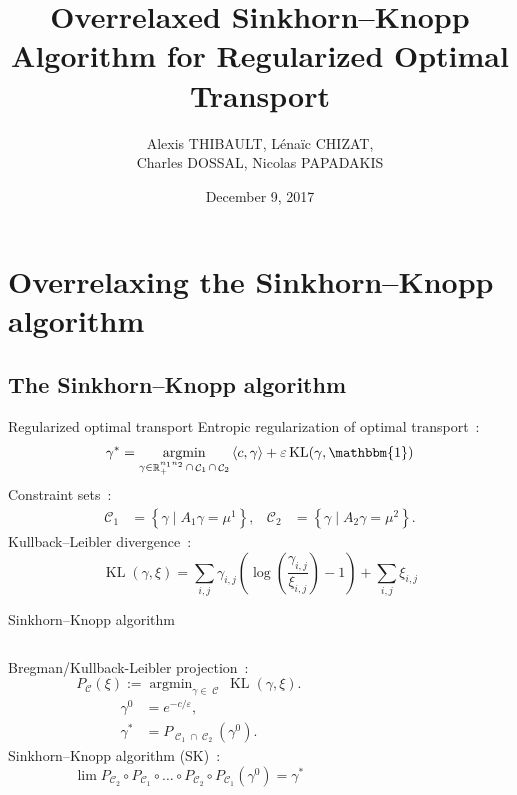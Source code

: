 \documentclass[compress]{beamer}
\title[Overrelaxed Sinkhorn--Knopp]{Overrelaxed Sinkhorn--Knopp Algorithm for Regularized Optimal Transport}
\author[A. THIBAULT]{
	Alexis THIBAULT, 
	L\'ena\"ic CHIZAT,\\
	Charles DOSSAL,
	Nicolas PAPADAKIS
}
\institute[OTML'17]{Optimal Transport and Machine Learning workshop \\ NIPS 2017}
\date{December 9, 2017}
\newcommand{\scal}[2]{\left\langle #1 , #2 \right\rangle}
\DeclareMathOperator{\IR}{\mathbb{R}}
\DeclareMathOperator*{\argmin}{argmin}
\DeclareMathOperator{\One}{\mathbbm{1}}
\DeclareMathOperator{\Ccal}{\mathcal{C}}
\DeclareMathOperator{\KL}{KL}
\renewcommand{\epsilon}{\varepsilon}
\begin{document}
\titlepage

\begin{frame}
\tableofcontents
\end{frame}

\section[Overrelaxing SK]{Overrelaxing the Sinkhorn--Knopp algorithm}

\subsection[SK algorithm]{The Sinkhorn--Knopp algorithm}
\begin{frame}{Regularized optimal transport}
Entropic regularization of optimal transport~:
\[
\gamma^* = \argmin_{\gamma \in \IR^{n_1 n_2}_+ \cap \Ccal_1 \cap \Ccal_2}
	\scal{c}{\gamma} + \epsilon \KL(\gamma,\One)
\]
\pause
Constraint sets~:
\begin{align}
\Ccal_1 &= \left\{ \gamma \mid A_1 \gamma = \mu^1 \right\},
&
\Ccal_2 &= \left\{ \gamma \mid A_2 \gamma = \mu^2 \right\}.
\end{align}
\pause
Kullback--Leibler divergence~:
\begin{equation}\label{KL}
\KL(\gamma,\xi) = \sum_{i,j} \gamma_{i,j} \left( \log \left( \frac{\gamma_{i,j}}{\xi_{i,j}} \right) -1  \right) + \sum_{i,j} \xi_{i,j}
\end{equation}
\end{frame}


\begin{frame}{Sinkhorn--Knopp algorithm}
\begin{columns}
\begin{column}{0.6\textwidth}
	
Bregman/Kullback-Leibler projection~:
\[
P_{\Ccal}(\xi) := \argmin_{\gamma \in \Ccal} \KL(\gamma,\xi).
\]
\pause
\begin{align*}
\gamma^0 &= e^{-c/\epsilon},\\
\gamma^* &= P_{\Ccal_1 \cap \Ccal_2}(\gamma^0).
\end{align*}
\pause
Sinkhorn--Knopp algorithm (SK)~:
\[
\lim P_{\Ccal_2}\circ P_{\Ccal_1} \circ \ldots \circ P_{\Ccal_2} \circ P_{\Ccal_1} (\gamma^0) = \gamma^*
\]
\end{column}

\begin{column}{0.4\textwidth}
	\centering
	
\end{column}
\end{columns}
\end{frame}
\end{document}
